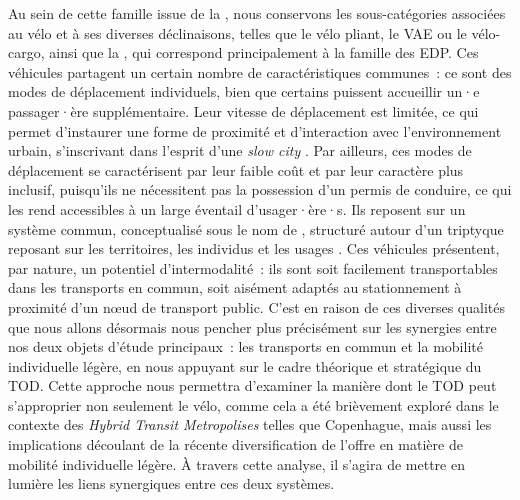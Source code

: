 \begin{refsegment}
Au sein de cette famille issue de la , nous conservons les sous-catégories associées au vélo et à ses diverses déclinaisons, telles que le vélo pliant, le \acrshort{VAE} ou le vélo-cargo, ainsi que la , qui correspond principalement à la famille des \acrshort{EDP}. Ces véhicules partagent un certain nombre de caractéristiques communes~: ce sont des modes de déplacement individuels, bien que certains  puissent accueillir un·e passager·ère supplémentaire. Leur vitesse de déplacement est limitée, ce qui permet d’instaurer une forme de proximité et d’interaction avec l’environnement urbain, s’inscrivant dans l’esprit d’une \textsl{slow city} \textcolor{blue}{\autocite[103-108]{bu_tout-voiture_2024}}. Par ailleurs, ces modes de déplacement se caractérisent par leur faible coût et par leur caractère plus inclusif, puisqu’ils ne nécessitent pas la possession d’un permis de conduire, ce qui les rend accessibles à un large éventail d’usager·ère·s. Ils reposent sur un système commun, conceptualisé sous le nom de , structuré autour d’un triptyque reposant sur les territoires, les individus et les usages \textcolor{blue}{\autocites[20-21]{rerat_au_2019}[492]{watson_how_2012}}. Ces véhicules présentent, par nature, un potentiel d'intermodalité~: ils sont soit facilement transportables dans les transports en commun, soit aisément adaptés au stationnement à proximité d’un nœud de transport public. C’est en raison de ces diverses qualités que nous allons désormais nous pencher plus précisément sur les synergies entre nos deux objets d’étude principaux~: les transports en commun et la mobilité individuelle légère, en nous appuyant sur le cadre théorique et stratégique du \acrshort{TOD}. Cette approche nous permettra d’examiner la manière dont le \acrshort{TOD} peut s’approprier non seulement le vélo, comme cela a été brièvement exploré dans le contexte des \textsl{Hybrid Transit Metropolises} telles que Copenhague, mais aussi les implications découlant de la récente diversification de l’offre en matière de mobilité individuelle légère. À travers cette analyse, il s’agira de mettre en lumière les liens synergiques entre ces deux systèmes.%

    \newpage

\end{refsegment}
